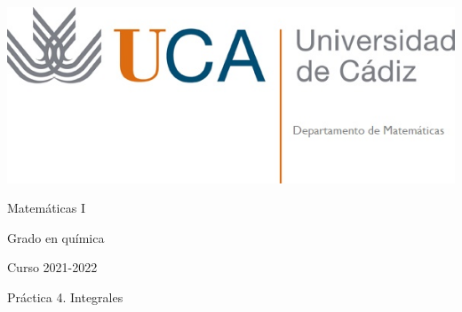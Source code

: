 \documentclass{article}
\title{}
\author{}
\date{}
\begin{document}
\begin{minipage}{.4\textwidth}
 \includegraphics[width=\linewidth]{uca.jpg}
\end{minipage}
%
\begin{minipage}{.6\textwidth}
 \begin{flushright}
  {\Large Matemáticas I}

  \medskip
  {\large Grado en química}

  \medskip
  Curso 2021-2022
 \end{flushright}
\end{minipage}

{\large Práctica 4. Integrales}

\vspace{-15pt}
\hrulefill










\end{document}
